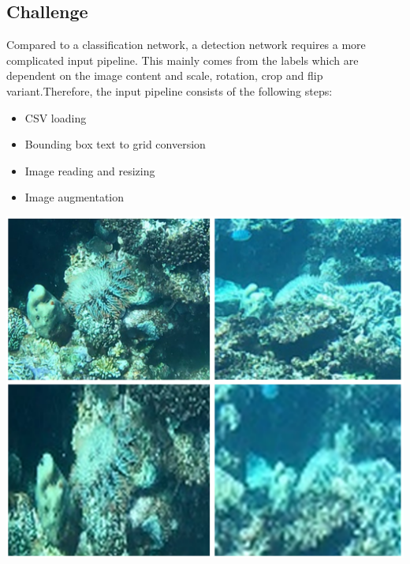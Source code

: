 \documentclass[landscape,a2,final,12pt]{issposter}
\begin{document}
\begin{samepage}
\begin{multicols}{3}
    \section{Challenge}
        \begin{minipage}[b]{0.3\textwidth}
            \begin{scriptsize}Compared to a classification network, a detection network requires a more complicated input pipeline. This mainly comes from the 
                labels which are dependent on the image content and scale, rotation, crop and flip variant.Therefore, the input pipeline consists of the following steps:
                \begin{itemize}
                    \item CSV loading
                    \item Bounding box text to grid conversion
                    \item Image reading and resizing
                    \item Image augmentation
                \end{itemize}

                \begin{center}
                    \includegraphics[scale=0.3]{6_img_quality.png}
                \end{center}

            \end{scriptsize}
        \end{minipage}
    \columnbreak
\end{multicols}
\end{samepage}
\end{document}
